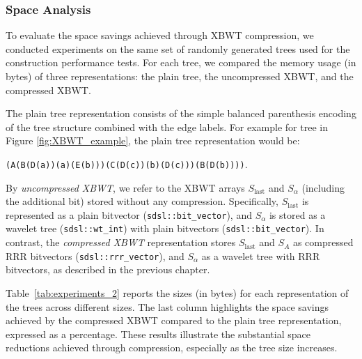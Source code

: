\subsubsection{Space Analysis}
To evaluate the space savings achieved through XBWT compression, we conducted experiments on the same set of randomly generated trees used for the construction performance tests. For each tree, we compared the memory usage (in bytes) of three representations: the plain tree, the uncompressed XBWT, and the compressed XBWT.

The plain tree representation consists of the simple balanced parenthesis encoding of the tree structure combined with the edge labels. For example for tree in Figure \cref{fig:XBWT_example}, the plain tree representation would be:

\texttt{(A(B(D(a))(a)(E(b)))(C(D(c))(b)(D(c)))(B(D(b))))}.

By \emph{uncompressed XBWT}, we refer to the XBWT arrays $S_{\text{last}}$ and $S_{\alpha}$ (including the additional bit) stored without any compression. Specifically, $S_{\text{last}}$ is represented as a plain bitvector (\texttt{sdsl::bit\_vector}), and $S_{\alpha}$ is stored as a wavelet tree (\texttt{sdsl::wt\_int}) with plain bitvectors (\texttt{sdsl::bit\_vector}). In contrast, the \emph{compressed XBWT} representation stores $S_{\text{last}}$ and $S_{A}$ as compressed RRR bitvectors (\texttt{sdsl::rrr\_vector}), and $S_{\alpha}$ as a wavelet tree with RRR bitvectors, as described in the previous chapter.

Table~\cref{tab:experiments_2} reports the sizes (in bytes) for each representation of the trees across different sizes. The last column highlights the space savings achieved by the compressed XBWT compared to the plain tree representation, expressed as a percentage. These results illustrate the substantial space reductions achieved through compression, especially as the tree size increases.

